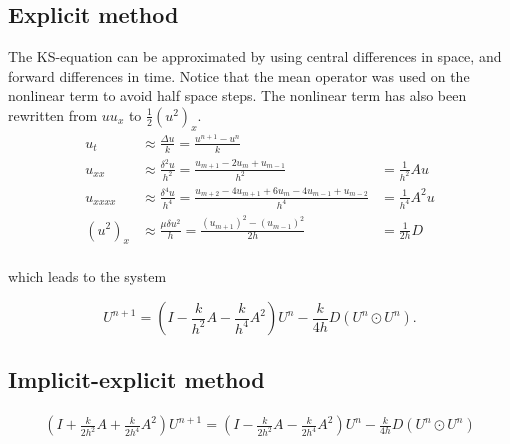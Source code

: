 \subsection{Explicit method}
The KS-equation can be approximated by using central differences in space, and forward differences in time. Notice that the mean operator was used on the nonlinear term to avoid half space steps.    The nonlinear term has also been rewritten from $uu_x$ to $\frac{1}{2}(u^2)_x$.
\begin{align*}
u_t &\approx \frac{\Delta u}{k} = \frac{u^{n+1}-u^n}{k} \\
u_{xx} &\approx \frac{\delta^2 u}{h^2} = \frac{u_{m+1}-2u_{m}+u_{m-1}}{h^2} &= \frac{1}{h^2}Au \\
u_{xxxx} &\approx \frac{\delta^4 u}{h^4} = \frac{u_{m+2}-4u_{m+1}+6u_m-4u_{m-1}+u_{m-2}}{h^4} &= \frac{1}{h^4}A^2u\\
(u^2)_{x} &\approx \frac{\mu \delta u^2}{h} = \frac{(u_{m+1})^2-(u_{m-1})^2}{2h} &= \frac{1}{2h}D\\
\end{align*}

which leads to the system

\begin{equation}
U^{n+1} = (I - \frac{k}{h^2}A - \frac{k}{h^4}A^2)U^n - \frac{k}{4h}D(U^{n}\odot U^n).
\end{equation}

\subsection{Implicit-explicit method}
\begin{align*}
(I + \frac{k}{2h^2}A + \frac{k}{2h^4}A^2)U^{n+1}
= (I - \frac{k}{2h^2}A - \frac{k}{2h^4}A^2)U^n - \frac{k}{4h}D(U^{n}\odot U^n)
\end{align*}

